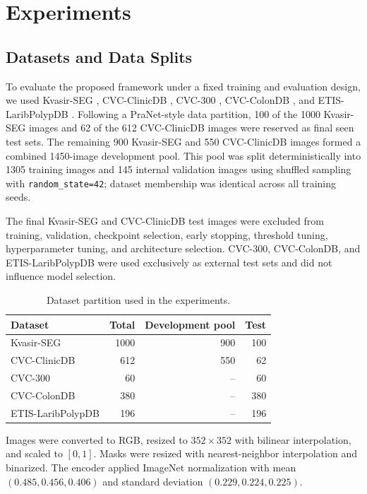 \section{Experiments}\label{experiments}

\subsection{Datasets and Data Splits}\label{dataset}

To evaluate the proposed framework under a fixed training and evaluation design, we
used Kvasir-SEG \cite{kvasirseg}, CVC-ClinicDB \cite{cvcclinicdb},
CVC-300 \cite{cvc300}, CVC-ColonDB \cite{cvccolondb}, and
ETIS-LaribPolypDB \cite{etis}. Following a PraNet-style data partition,
100 of the 1000 Kvasir-SEG images and 62 of the 612 CVC-ClinicDB images
were reserved as final seen test sets. The remaining 900 Kvasir-SEG and
550 CVC-ClinicDB images formed a combined 1450-image development pool.
This pool was split deterministically into 1305 training images and 145 internal
validation images using shuffled sampling with \texttt{random\_state=42}; dataset
membership was identical across all training seeds.

The final Kvasir-SEG and CVC-ClinicDB test images were excluded from training,
validation, checkpoint selection, early stopping, threshold tuning, hyperparameter
tuning, and architecture selection. CVC-300, CVC-ColonDB, and
ETIS-LaribPolypDB were used exclusively as external test sets and did not influence
model selection.

\begin{table}[htbp]
\centering
\caption{Dataset partition used in the experiments.}
\label{tab:dataset-splits}
\small
\setlength{\tabcolsep}{4pt}
\renewcommand{\arraystretch}{1.1}
\begin{tabular}{lrrr}
\toprule
Dataset & Total & Development pool & Test \\
\midrule
Kvasir-SEG & 1000 & 900 & 100 \\
CVC-ClinicDB & 612 & 550 & 62 \\
CVC-300 & 60 & -- & 60 \\
CVC-ColonDB & 380 & -- & 380 \\
ETIS-LaribPolypDB & 196 & -- & 196 \\
\bottomrule
\end{tabular}
\end{table}

Images were converted to RGB, resized to $352\times352$ with bilinear
interpolation, and scaled to $[0,1]$. Masks were resized with
nearest-neighbor interpolation and binarized. The encoder applied
ImageNet normalization with mean $(0.485,0.456,0.406)$ and standard
deviation $(0.229,0.224,0.225)$.


